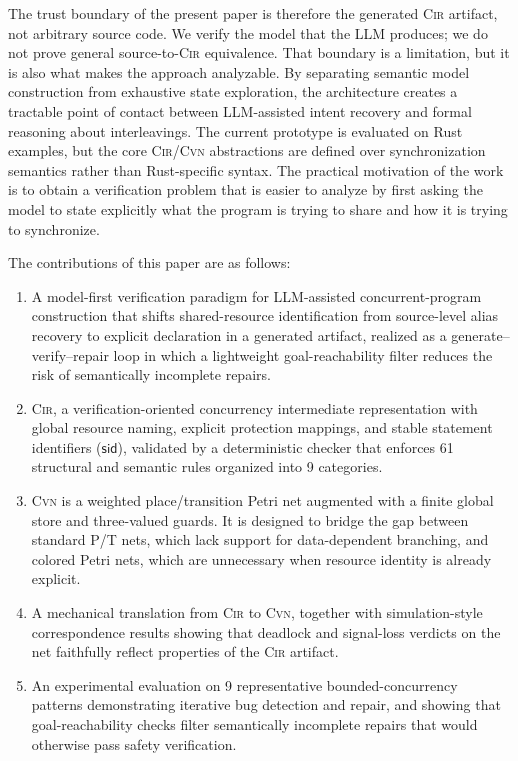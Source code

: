 \documentclass[sigconf]{acmart}
\begin{document}
The trust boundary of the present paper is therefore the generated \textsc{Cir} artifact, not arbitrary source code. We verify the model that the LLM produces; we do not prove general source-to-\textsc{Cir} equivalence. That boundary is a limitation, but it is also what makes the approach analyzable. By separating semantic model construction from exhaustive state exploration, the architecture creates a tractable point of contact between LLM-assisted intent recovery and formal reasoning about interleavings. The current prototype is evaluated on Rust examples, but the core \textsc{Cir}/\textsc{Cvn} abstractions are defined over synchronization semantics rather than Rust-specific syntax. The practical motivation of the work is to obtain a verification problem that is easier to analyze by first asking the model to state explicitly what the program is trying to share and how it is trying to synchronize.

The contributions of this paper are as follows:
\begin{enumerate}[leftmargin=*]

\item A model-first verification paradigm for LLM-assisted
  concurrent-program construction that shifts shared-resource
  identification from source-level alias recovery to explicit
  declaration in a generated artifact, realized as a
  generate--verify--repair loop in which a lightweight
  goal-reachability filter reduces the risk of semantically
  incomplete repairs.

\item \textsc{Cir}, a verification-oriented concurrency
  intermediate representation with global resource naming,
  explicit protection mappings, and stable statement identifiers
  ($\mathsf{sid}$), validated by a deterministic checker that
  enforces 61 structural and semantic rules organized into 9
  categories.

\item \textsc{Cvn} is a weighted place/transition Petri net augmented with a finite global store and three-valued guards. It is designed to bridge the gap between standard P/T nets, which lack support for data-dependent branching, and colored Petri nets, which are unnecessary when resource identity is already explicit.

\item A mechanical translation from \textsc{Cir} to
  \textsc{Cvn}, together with simulation-style correspondence
  results showing that deadlock and signal-loss verdicts on the
  net faithfully reflect properties of the \textsc{Cir} artifact.

\item An experimental evaluation on 9 representative
  bounded-concurrency patterns demonstrating iterative bug
  detection and repair, and showing that goal-reachability checks
  filter semantically incomplete repairs that would otherwise pass safety verification.

\end{enumerate}
\end{document}
